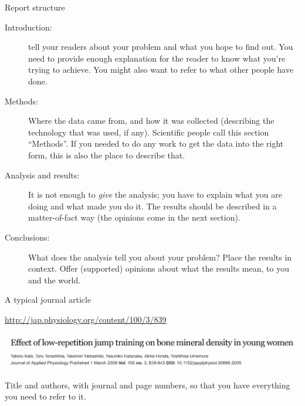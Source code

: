 \documentclass[unknownkeysallowed]{beamer}\usepackage[]{graphicx}\usepackage[]{color}
\begin{document}
\begin{frame}[fragile]{Report structure}

  \begin{description}
    \item[Introduction:] tell your readers about your problem and what
      you hope to find out. You need to provide enough explanation for 
      the reader to know what you're trying to achieve. You might also
      want to refer to what other people have done.
    \item[Methods:] Where the data came from, and how it was collected
      (describing the technology that was used, if any). Scientific
      people call this section ``Methods''. If you needed to do any
      work to get the data into the right form, this is also the place
      to describe that.
    \item[Analysis and results:] It is not enough to \emph{give} the
      analysis; you have to explain what you are doing and what made
      you do it. The results should be described in a matter-of-fact
      way (the opinions come in the next section).
    \item[Conclusions:] What does the analysis tell you about your
      problem? Place the results in context. Offer (supported)
      opinions about what the results mean, to you and the world.
    \end{description}

\end{frame}

\begin{frame}[fragile]{A typical journal article}
  
  \url{http://jap.physiology.org/content/100/3/839}
  
\includegraphics[width=\textwidth]{titlebar}  

Title and authors, with journal and page numbers, so that you have
everything you need to refer to it.

\end{frame}
\end{document}
